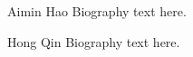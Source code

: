 \documentclass[journal]{IEEEtran}
\begin{document}

\begin{IEEEbiographynophoto}{Aimin Hao}
Biography text here.
\end{IEEEbiographynophoto}

\begin{IEEEbiographynophoto}{Hong Qin}
Biography text here.
\end{IEEEbiographynophoto}






\end{document}
